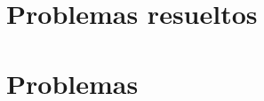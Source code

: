 \section{\large Problemas resueltos}
{
    \begin{problem}
    \end{problem}
}

\section{\large Problemas}
{
    \begin{problem}
    \end{problem}
}